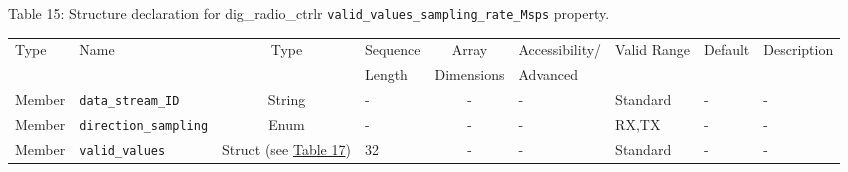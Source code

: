 \documentclass{article}
\def\comp{dig\_radio\_ctrlr}
\begin{document}
\begin{landscape}
	\noindent Table \hypertarget{tab15}{15}: Structure declaration for \comp{} \verb+valid_values_sampling_rate_Msps+ property.
	\begin{scriptsize}
		\noindent\begin{longtable}{|p{1.8cm}|p{3.6cm}|c|p{2cm}|c|p{2cm}|p{1.7cm}|p{0.8cm}|p{4.97cm}|}
			\hline
			\rowcolor{blue}
			Type         & Name                                & Type & Sequence & Array      & Accessibility/ & Valid Range  & Default & Description                                                                                                                                                                                                                       \\
			\rowcolor{blue}
			             &                                     &      & Length   & Dimensions & Advanced       &              &         &                                                                                                                                                                                                                             \\
			\hline
			Member       & \verb+data_stream_ID+               & String& -       & -          & -              & Standard     & -       & - \\
			\hline
			Member       & \verb+direction_sampling+           & Enum  & -       & -          & -              & RX,TX        & -       & - \\
			\hline
			Member       & \verb+valid_values+                 & Struct (see \hyperlink{tab17}{Table 17}) & 32      & -          & -              & Standard & -       & - \\
			\hline
		\end{longtable}
	\end{scriptsize}


\end{landscape}
\end{document}
